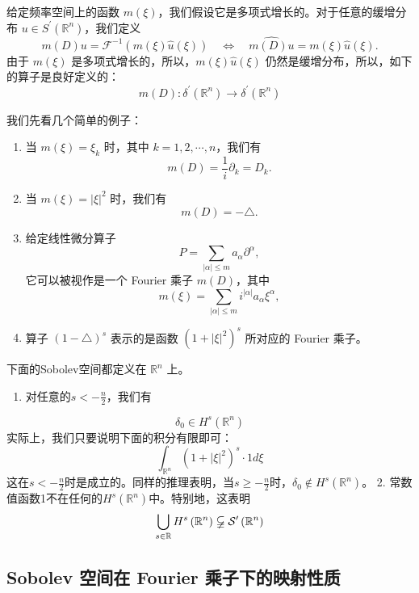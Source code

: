 \begin{definition}[Fourier 乘子]
给定频率空间上的函数 $m(\xi)$，我们假设它是多项式增长的。对于任意的缓增分布 $u \in S^{\prime}\left(\mathbb{R}^n\right)$，我们定义
\[
m(D) u=\mathcal{F}^{-1}(m(\xi) \widehat{u}(\xi)) \quad \Leftrightarrow \quad \widehat{m(D) u}=m(\xi) \widehat{u}(\xi) .
\]由于 $m(\xi)$ 是多项式增长的，所以，$m(\xi) \widehat{u}(\xi)$ 仍然是缓增分布，所以，如下的算子是良好定义的：
\[
m(D): \delta^{\prime}\left(\mathbb{R}^n\right) \rightarrow \delta^{\prime}\left(\mathbb{R}^n\right)
\]
\end{definition}
\begin{example}
我们先看几个简单的例子：
	\begin{enumerate}
		\item 当 $m(\xi)=\xi_k$ 时，其中 $k=1,2, \cdots, n$，我们有
\[
m(D)=\frac{1}{i} \partial_k=D_k .
\]		\item 当 $m(\xi)=|\xi|^2$ 时，我们有
\[
m(D)=-\triangle .
\]		\item 给定线性微分算子
\[
P=\sum_{|\alpha| \leqslant m} a_\alpha \partial^\alpha,
\]它可以被视作是一个 Fourier 乘子 $m(D)$，其中
\[
m(\xi)=\sum_{|\alpha| \leqslant m} i^{|\alpha|} a_\alpha \xi^\alpha,
\]		\item 算子 $(1-\triangle)^s$ 表示的是函数 $\left(1+|\xi|^2\right)^s$ 所对应的 Fourier 乘子。
	\end{enumerate}
\end{example}
\begin{example}
下面的Sobolev空间都定义在 $\mathbb{R}^n$ 上。
	\begin{enumerate}
		\item 对任意的$s<-\frac{n}{2}$，我们有
	\end{enumerate}
\[
\delta_0 \in H^s\left(\mathbb{R}^n\right)
\]实际上，我们只要说明下面的积分有限即可：
\[
\int_{\mathbb{R}^n}\left(1+|\xi|^2\right)^s \cdot 1 d \xi
\]这在$s<-\frac{n}{2}$时是成立的。同样的推理表明，当$s \geqslant-\frac{n}{2}$时，$\delta_0 \notin H^s\left(\mathbb{R}^n\right)$。
2.  常数值函数1不在任何的$H^s\left(\mathbb{R}^n\right)$中。特别地，这表明
\[
\bigcup_{s \in \mathbb{R}} H^s\left(\mathbb{R}^n\right) \varsubsetneqq \mathcal{S}^{\prime}\left(\mathbb{R}^n\right)
\]
\end{example}
\subsection{Sobolev 空间在 Fourier 乘子下的映射性质}

